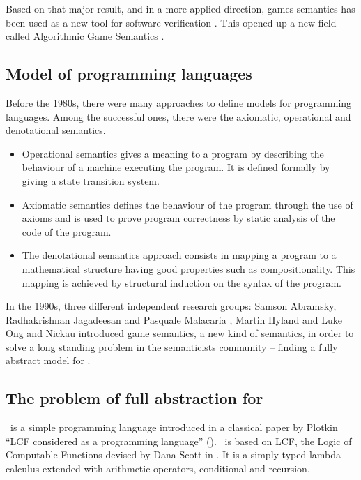 Based on that major result, and in a more applied direction, games semantics has been used as a new tool for software verification \cite{ghicamccusker00}. This opened-up a new field called Algorithmic Game Semantics \citep{Abr02}.




\subsection{Model of programming languages}

Before the 1980s, there were many approaches to define models for programming languages. Among the successful ones, there were the axiomatic, operational and denotational semantics.
\begin{itemize}
\item Operational semantics gives a meaning to a program by describing the behaviour of a machine executing the program. It is defined formally
by giving a state transition system.
\item Axiomatic semantics defines the behaviour of the program through the use of axioms and is used to prove program correctness
by static analysis of the code of the program.
\item The denotational semantics approach consists in mapping a program to a mathematical structure
having good properties such as compositionality. This mapping is achieved by structural induction on the syntax of the program.
\end{itemize}

In the 1990s, three different independent research groups: Samson
Abramsky, Radhakrishnan Jagadeesan and Pasquale Malacaria
\citep{abramsky94full}, Martin Hyland and Luke Ong
\citep{hylandong_pcf} and Nickau \citep{Nickau:lfcs94} introduced
game semantics, a new kind of semantics, in order to solve a long
standing problem in the semanticists community -- finding a fully
abstract model for \pcf.

\subsection{The problem of full abstraction for \pcf}

\pcf\ is a simple programming language introduced in a classical
paper by Plotkin ``LCF considered as a programming language''
(\cite{DBLP:journals/tcs/Plotkin77}). \pcf\ is based on LCF, the
Logic of Computable Functions devised by Dana Scott in
\cite{scott_lcf}. It is a simply-typed lambda calculus extended with
arithmetic operators, conditional and recursion.


